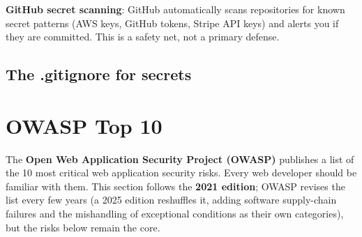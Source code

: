 \begin{codebox}[short]

\begin{Shaded}
\begin{Highlighting}[]
\end{Highlighting}
\end{Shaded}

\end{codebox}

\noindent{}\textbf{GitHub secret scanning}: GitHub automatically scans repositories for known secret patterns (AWS keys, GitHub tokens, Stripe API keys) and alerts you if they are committed. This is a safety net, not a primary defense.

\subsection*{The .gitignore for secrets}\label{38-security:the-gitignore-for-secrets}

\begin{codebox}[short]

\begin{Shaded}
\begin{Highlighting}[]



\end{Highlighting}
\end{Shaded}

\end{codebox}

\setcounter{section}{5}
\section{OWASP Top 10}\label{38-security:386-owasp-top-10}

The \textbf{Open Web Application Security Project (OWASP)} publishes a list of the 10 most critical web application security risks. Every web developer should be familiar with them. This section follows the \textbf{2021 edition}; OWASP revises the list every few years (a 2025 edition reshuffles it, adding software supply-chain failures and the mishandling of exceptional conditions as their own categories), but the risks below remain the core.

